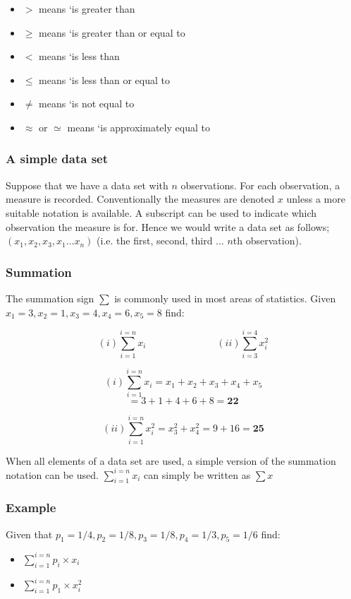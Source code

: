 \documentclass[slidemain.tex]{subfiles}
\begin{document}
 


\begin{frame}
	
\begin{itemize}
	\item $>$  means `is greater than
	\item $\geq$ means `is greater than or equal to
	\item $<$ means `is less than
	\item $\leq$ means `is less than or equal to
	\item $\neq$ means `is not equal to
	\item $\approx$ or $\simeq$ means `is approximately equal to
\end{itemize}
\end{frame}


\begin{frame}
\frametitle{A simple data set}Suppose that we have a data set with $n$ observations. For each observation, a measure is recorded. Conventionally the measures are denoted $x$ unless a more suitable notation is available. A subscript can be used to indicate which observation the measure is for.
Hence we would write a data set as follows; $(x_{1}, x_{2},x_{3} , x_{1} \dots x_{n})$ (i.e. the first, second, third ... $n$th observation).

\end{frame}

\begin{frame}
\frametitle{Summation}
The summation sign $\sum$ is commonly used in most areas of statistics.
Given $x_1 = 3, x_2= 1, x_3 = 4, x_4 = 6, x_5= 8 $ find:

\[
(i) \displaystyle\sum_{i=1}^{i=n} x_{i}  \hspace{3cm}
(ii) \displaystyle\sum_{i=3}^{i=4} x_{i}^2
\]
\end{frame}
\begin{frame}
\[(i) \displaystyle\sum_{i=1}^{i=n} x_{i} = x_1 + x_2 +  x_3 +  x_4 + x_5 \]  \[= 3 +1 +4 +6 + 8  = \textbf{22} \]

\[ (ii) \displaystyle\sum_{i=1}^{i=n} x_{i}^2 = x_3^2 + x_4^2  = 9 + 16 = \textbf{25} \]

\noindent When all elements of a data set are used, a simple version of the summation notation can be used.
$\displaystyle\sum_{i=1}^{i=n} x_{i}$  can simply be written as $\sum x$

\end{frame}
\begin{frame}
\frametitle{Example}
Given that $p_1= 1/4, p_2= 1/8, p_3= 1/8,p_4= 1/3, p_5 = 1/6$ find:

\begin{itemize}
	\item $\displaystyle\sum_{i=1}^{i=n} p_{i} \times x_{i}$
	\item $\displaystyle\sum_{i=1}^{i=n} p_{1} \times x_{i}^2$
\end{itemize}

\end{frame}
\end{document}
